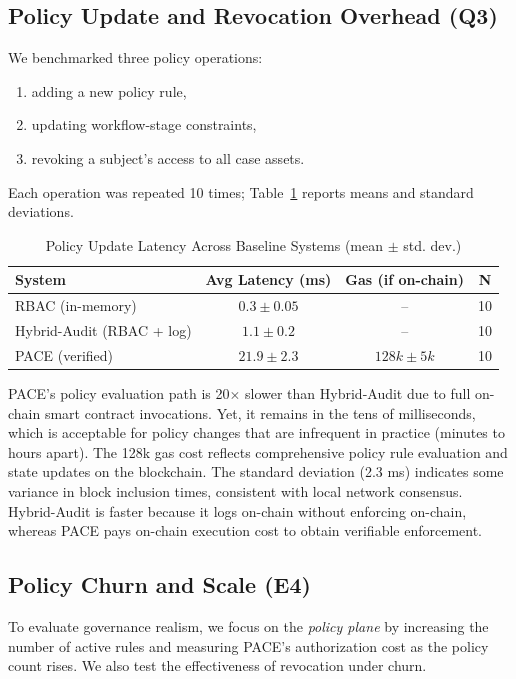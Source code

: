 \documentclass[pdflatex,sn-mathphys-num]{sn-jnl}
\begin{document}
\subsection{Policy Update and Revocation Overhead (Q3)}
We benchmarked three policy operations:
\begin{enumerate}
	\item adding a new policy rule,
	\item updating workflow-stage constraints,
	\item revoking a subject's access to all case assets.
\end{enumerate}
Each operation was repeated 10 times; Table~\ref{tab:policy} reports means
and standard deviations.
\begin{table}[!htbp]
	\centering
	\caption{Policy Update Latency Across Baseline Systems (mean $\pm$ std. dev.)}
	\begin{tabularx}{\columnwidth}{>{\raggedright\arraybackslash}X c c c}
		\toprule
		\textbf{System}           & \textbf{Avg Latency (ms)} & \textbf{Gas (if on-chain)} & \textbf{N} \\
		\midrule
		RBAC (in-memory)          & $0.3 \pm 0.05$            & --                         & 10         \\
		Hybrid-Audit (RBAC + log) & $1.1 \pm 0.2$             & --                         & 10         \\
		PACE (verified)     & $21.9 \pm 2.3$            & $128k \pm 5k$              & 10         \\
		\bottomrule
	\end{tabularx}
	\label{tab:policy}
\end{table}
PACE's policy evaluation path is 20$\times$ slower than Hybrid-Audit due to full on-chain smart contract invocations. Yet, it remains in the tens of milliseconds, which is acceptable for policy changes that are infrequent in practice (minutes to hours apart). The 128k gas cost reflects comprehensive policy rule evaluation and state updates on the blockchain. The standard deviation (2.3 ms) indicates some variance in block inclusion times, consistent with local network consensus. Hybrid-Audit is faster because it logs on-chain without enforcing on-chain, whereas PACE pays on-chain execution cost to obtain verifiable enforcement.

\subsection{Policy Churn and Scale (E4)}
To evaluate governance realism, we focus on the \emph{policy plane} by increasing the number of active rules and measuring PACE's authorization cost as the policy count rises. We also test the effectiveness of revocation under churn.
\end{document}
